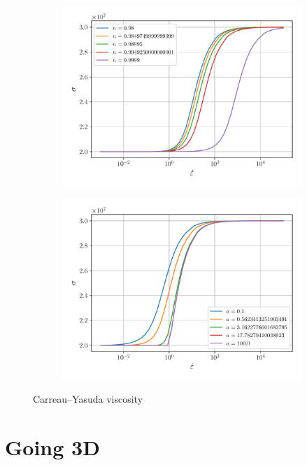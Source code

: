 \documentclass[12pt]{article}
\begin{document}
\begin{figure}[!htb]
	\begin{subfigure}{0.48\textwidth}
		\centering
		\includegraphics[width=\linewidth]{carreau-ns}
		\caption{ }
	\end{subfigure}
	\begin{subfigure}{0.48\textwidth}
		\centering
		\includegraphics[width=\linewidth]{carreau-as} 
		\caption{ }
	\end{subfigure}
	\caption{Carreau--Yasuda viscosity}
\end{figure}

\section{Going 3D}
\end{document}
